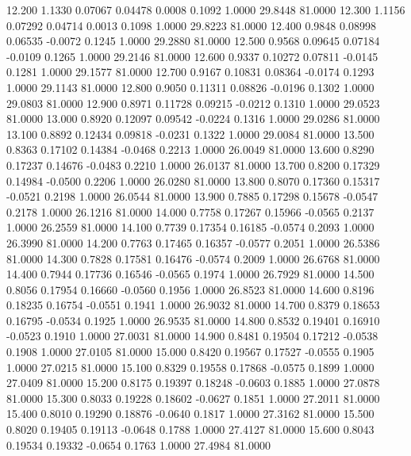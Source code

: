   12.200   1.1330   0.07067   0.04478   0.0008   0.1092   1.0000  29.8448  81.0000
  12.300   1.1156   0.07292   0.04714   0.0013   0.1098   1.0000  29.8223  81.0000
  12.400   0.9848   0.08998   0.06535  -0.0072   0.1245   1.0000  29.2880  81.0000
  12.500   0.9568   0.09645   0.07184  -0.0109   0.1265   1.0000  29.2146  81.0000
  12.600   0.9337   0.10272   0.07811  -0.0145   0.1281   1.0000  29.1577  81.0000
  12.700   0.9167   0.10831   0.08364  -0.0174   0.1293   1.0000  29.1143  81.0000
  12.800   0.9050   0.11311   0.08826  -0.0196   0.1302   1.0000  29.0803  81.0000
  12.900   0.8971   0.11728   0.09215  -0.0212   0.1310   1.0000  29.0523  81.0000
  13.000   0.8920   0.12097   0.09542  -0.0224   0.1316   1.0000  29.0286  81.0000
  13.100   0.8892   0.12434   0.09818  -0.0231   0.1322   1.0000  29.0084  81.0000
  13.500   0.8363   0.17102   0.14384  -0.0468   0.2213   1.0000  26.0049  81.0000
  13.600   0.8290   0.17237   0.14676  -0.0483   0.2210   1.0000  26.0137  81.0000
  13.700   0.8200   0.17329   0.14984  -0.0500   0.2206   1.0000  26.0280  81.0000
  13.800   0.8070   0.17360   0.15317  -0.0521   0.2198   1.0000  26.0544  81.0000
  13.900   0.7885   0.17298   0.15678  -0.0547   0.2178   1.0000  26.1216  81.0000
  14.000   0.7758   0.17267   0.15966  -0.0565   0.2137   1.0000  26.2559  81.0000
  14.100   0.7739   0.17354   0.16185  -0.0574   0.2093   1.0000  26.3990  81.0000
  14.200   0.7763   0.17465   0.16357  -0.0577   0.2051   1.0000  26.5386  81.0000
  14.300   0.7828   0.17581   0.16476  -0.0574   0.2009   1.0000  26.6768  81.0000
  14.400   0.7944   0.17736   0.16546  -0.0565   0.1974   1.0000  26.7929  81.0000
  14.500   0.8056   0.17954   0.16660  -0.0560   0.1956   1.0000  26.8523  81.0000
  14.600   0.8196   0.18235   0.16754  -0.0551   0.1941   1.0000  26.9032  81.0000
  14.700   0.8379   0.18653   0.16795  -0.0534   0.1925   1.0000  26.9535  81.0000
  14.800   0.8532   0.19401   0.16910  -0.0523   0.1910   1.0000  27.0031  81.0000
  14.900   0.8481   0.19504   0.17212  -0.0538   0.1908   1.0000  27.0105  81.0000
  15.000   0.8420   0.19567   0.17527  -0.0555   0.1905   1.0000  27.0215  81.0000
  15.100   0.8329   0.19558   0.17868  -0.0575   0.1899   1.0000  27.0409  81.0000
  15.200   0.8175   0.19397   0.18248  -0.0603   0.1885   1.0000  27.0878  81.0000
  15.300   0.8033   0.19228   0.18602  -0.0627   0.1851   1.0000  27.2011  81.0000
  15.400   0.8010   0.19290   0.18876  -0.0640   0.1817   1.0000  27.3162  81.0000
  15.500   0.8020   0.19405   0.19113  -0.0648   0.1788   1.0000  27.4127  81.0000
  15.600   0.8043   0.19534   0.19332  -0.0654   0.1763   1.0000  27.4984  81.0000

